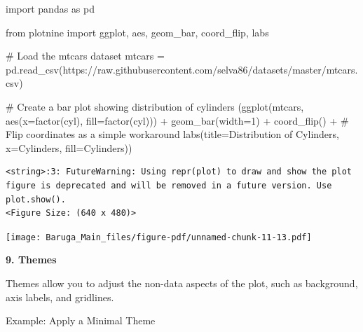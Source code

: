 \documentclass[
  letterpaper,
  DIV=11,
  numbers=noendperiod]{scrreprt}
\newenvironment{Shaded}{\begin{snugshade}}{\end{snugshade}}
\newcommand{\CommentTok}[1]{\textcolor[rgb]{0.37,0.37,0.37}{#1}}
\newcommand{\DecValTok}[1]{\textcolor[rgb]{0.68,0.00,0.00}{#1}}
\newcommand{\ImportTok}[1]{\textcolor[rgb]{0.00,0.46,0.62}{#1}}
\newcommand{\NormalTok}[1]{\textcolor[rgb]{0.00,0.23,0.31}{#1}}
\newcommand{\OperatorTok}[1]{\textcolor[rgb]{0.37,0.37,0.37}{#1}}
\newcommand{\StringTok}[1]{\textcolor[rgb]{0.13,0.47,0.30}{#1}}
\begin{document}
\begin{Shaded}
\begin{Highlighting}[]
\ImportTok{import}\NormalTok{ pandas }\ImportTok{as}\NormalTok{ pd}

\ImportTok{from}\NormalTok{ plotnine }\ImportTok{import}\NormalTok{ ggplot, aes, geom\_bar, coord\_flip, labs}

\CommentTok{\# Load the mtcars dataset}
\NormalTok{mtcars }\OperatorTok{=}\NormalTok{ pd.read\_csv(}\StringTok{\textquotesingle{}https://raw.githubusercontent.com/selva86/datasets/master/mtcars.csv\textquotesingle{}}\NormalTok{)}

\CommentTok{\# Create a bar plot showing distribution of cylinders}
\NormalTok{(ggplot(mtcars, aes(x}\OperatorTok{=}\StringTok{\textquotesingle{}factor(cyl)\textquotesingle{}}\NormalTok{, fill}\OperatorTok{=}\StringTok{\textquotesingle{}factor(cyl)\textquotesingle{}}\NormalTok{)) }\OperatorTok{+}
\NormalTok{ geom\_bar(width}\OperatorTok{=}\DecValTok{1}\NormalTok{) }\OperatorTok{+}
\NormalTok{ coord\_flip() }\OperatorTok{+}  \CommentTok{\# Flip coordinates as a simple workaround}
\NormalTok{ labs(title}\OperatorTok{=}\StringTok{\textquotesingle{}Distribution of Cylinders\textquotesingle{}}\NormalTok{,}
\NormalTok{      x}\OperatorTok{=}\StringTok{\textquotesingle{}Cylinders\textquotesingle{}}\NormalTok{,}
\NormalTok{      fill}\OperatorTok{=}\StringTok{\textquotesingle{}Cylinders\textquotesingle{}}\NormalTok{))}
\end{Highlighting}
\end{Shaded}

\begin{verbatim}
<string>:3: FutureWarning: Using repr(plot) to draw and show the plot figure is deprecated and will be removed in a future version. Use plot.show().
<Figure Size: (640 x 480)>
\end{verbatim}

\texttt{[image: Baruga\_Main\_files/figure-pdf/unnamed-chunk-11-13.pdf]}

\textbf{9. Themes}

Themes allow you to adjust the non-data aspects of the plot, such as
background, axis labels, and gridlines.

Example: Apply a Minimal Theme
\end{document}

